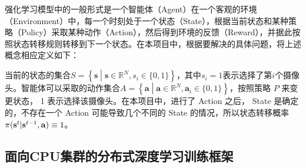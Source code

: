 强化学习模型中的一般形式是一个智能体（Agent）在一个客观的环境（Environment）中，每一个时刻处于一个状态（State），根据当前状态和某种策略（Policy）采取某种动作（Action），然后得到环境的反馈（Reward），并据此按照状态转移规则转移到下一个状态。在本项目中，根据要解决的具体问题，将上述概念相应定义如下：

当前的状态的集合$S=\left\{\mathbf{s}\middle\vert\mathbf{s}\in\mathbb{R}^{N}, s_i\in\{0, 1\}\right\}$，其中$s_i=1$表示选择了第$i$个摄像头。智能体可以采取的动作集合$A=\left\{\mathbf{a}\middle\vert\mathbf{a}\in\mathbb{R}^N,\mathbf{a}_i \in \{0,1\}\right\}$，按照策略 $P$ 来变更状态， 1 表示选择该摄像头。在本项目中，进行了 Action 之后， State 是确定的，不存在一个 Action 可能导致几个不同的 State 的情况，所以状态转移概率 $\pi({\bf s}^{t}|{\bf s}^{t-1}, {\bf a})\equiv1$。

\subsection{面向CPU集群的分布式深度学习训练框架}
